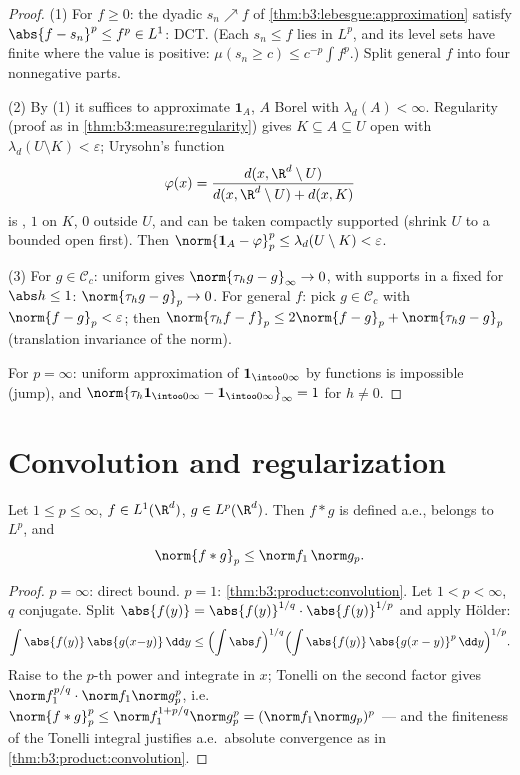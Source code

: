 \begin{proof}
(1) For $f \geq 0$: the dyadic $s_n \nearrow f$ of
\cref{thm:b3:lebesgue:approximation} satisfy $\abs{f - s_n}^p
\leq f^p \in L^1$: DCT. (Each $s_n \leq f$ lies in $L^p$, and
its level sets have finite  where the value is
positive: $\mu(s_n \geq c) \leq c^{-p}\int f^p$.) Split
general $f$ into four nonnegative parts.

(2) By (1) it suffices to approximate $\mathbf 1_A$, $A$ Borel
with $\lambda_d(A) < \infty$. Regularity (proof as in
\cref{thm:b3:measure:regularity}) gives  $K \subseteq A
\subseteq U$ open with $\lambda_d(U\setminus K) <
\varepsilon$; Urysohn's function
\[
\varphi(x) = \frac{d(x, \R^d\setminus U)}{d(x, \R^d\setminus U)
+ d(x, K)}
\]
is , $1$ on $K$, $0$ outside $U$, and can be taken
compactly supported (shrink $U$ to a bounded open first). Then
$\norm{\mathbf 1_A - \varphi}_p^p \leq \lambda_d(U\setminus K)
< \varepsilon$.

(3) For $g \in \mathcal C_c$: uniform  gives
$\norm{\tau_hg - g}_\infty \to 0$, with supports in a fixed
 for $\abs h \leq 1$: $\norm{\tau_hg - g}_p \to 0$. For
general $f$: pick $g \in \mathcal C_c$ with $\norm{f - g}_p <
\varepsilon$; then $\norm{\tau_hf - f}_p \leq 2\norm{f - g}_p +
\norm{\tau_hg - g}_p$ (translation invariance of the norm).

For $p = \infty$: uniform approximation of $\mathbf
1_{\intoo0\infty}$ by  functions is impossible
(jump), and $\norm{\tau_h\mathbf 1_{\intoo0\infty} - \mathbf
1_{\intoo0\infty}}_\infty = 1$ for $h \neq 0$.
\end{proof}

\section{Convolution and regularization}

\begin{theorem}\label{thm:b3:lp:young}
Let $1 \leq p \leq \infty$, $f \in L^1(\R^d)$, $g \in
L^p(\R^d)$. Then $f * g$ is defined a.e., belongs to $L^p$,
and
\[
\norm{f * g}_p \leq \norm f_1\,\norm g_p .
\]
\end{theorem}

\begin{proof}
$p = \infty$: direct bound. $p = 1$:
\cref{thm:b3:product:convolution}. Let $1 < p < \infty$, $q$
conjugate. Split $\abs{f(y)} = \abs{f(y)}^{1/q}\cdot
\abs{f(y)}^{1/p}$ and apply H\"older:
\[
\int\abs{f(y)}\,\abs{g(x{-}y)}\,\dd y
\leq \Bigl(\int\abs f\Bigr)^{1/q}
\Bigl(\int\abs{f(y)}\,\abs{g(x - y)}^p\,\dd y\Bigr)^{1/p} .
\]
Raise to the $p$-th power and integrate in $x$; Tonelli on the
second factor gives $\norm f_1^{p/q}\cdot\norm f_1\norm g_p^p$,
i.e.\ $\norm{f*g}_p^p \leq \norm f_1^{1 + p/q}\norm g_p^p =
(\norm f_1\norm g_p)^p$ --- and the finiteness of the Tonelli
integral justifies a.e.\ absolute convergence as in
\cref{thm:b3:product:convolution}.
\end{proof}

